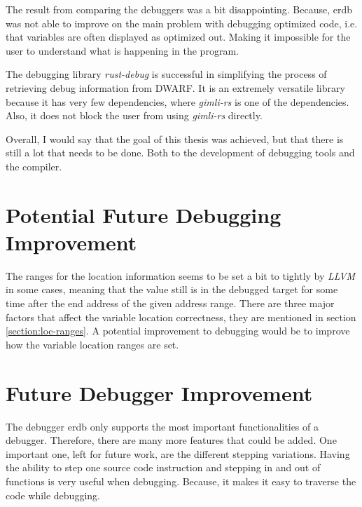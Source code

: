 

The result from comparing the debuggers was a bit disappointing.
Because, \gls{erdb} was not able to improve on the main problem with debugging optimized code, i.e. that variables are often displayed as optimized out.
Making it impossible for the user to understand what is happening in the program.


The debugging library \emph{rust-debug} is successful in simplifying the process of retrieving debug information from \gls{DWARF}.
It is an extremely versatile library because it has very few dependencies, where \emph{gimli-rs} is one of the dependencies.
Also, it does not block the user from using \emph{gimli-rs} directly.


Overall, I would say that the goal of this thesis was achieved, but that there is still a lot that needs to be done.
Both to the development of debugging tools and the compiler.


\section{Potential Future Debugging Improvement}
The ranges for the location information seems to be set a bit to tightly by \emph{LLVM} in some cases, meaning that the value still is in the debugged target for some time after the end address of the given address range.
There are three major factors that affect the variable location correctness, they are mentioned in section \ref{section:loc-ranges}.
A potential improvement to debugging would be to improve how the variable location ranges are set.


\section{Future Debugger Improvement}
The debugger \gls{erdb} only supports the most important functionalities of a debugger.
Therefore, there are many more features that could be added.
One important one, left for future work, are the different stepping variations.
Having the ability to step one source code instruction and stepping in and out of functions is very useful when debugging.
Because, it makes it easy to traverse the code while debugging.


